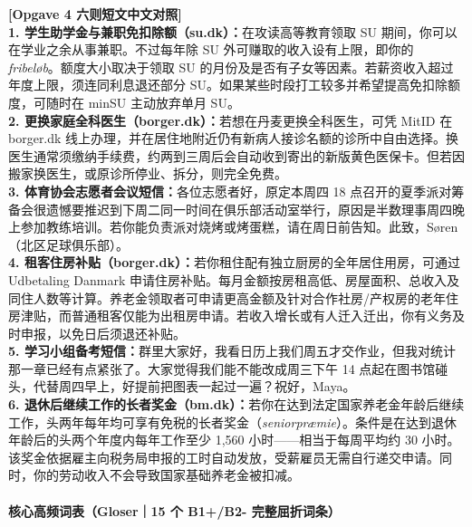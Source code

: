 \begin{transbox}
\small
\textbf{\color{NCDTeal}[Opgave 4 六则短文中文对照]}\\
\textbf{1. 学生助学金与兼职免扣除额（su.dk）：}在攻读高等教育领取 SU 期间，你可以在学业之余从事兼职。不过每年除 SU 外可赚取的收入设有上限，即你的 \textit{fribeløb}。额度大小取决于领取 SU 的月份及是否有子女等因素。若薪资收入超过年度上限，须连同利息退还部分 SU。如果某些时段打工较多并希望提高免扣除额度，可随时在 minSU 主动放弃单月 SU。\\
\textbf{2. 更换家庭全科医生（borger.dk）：}若想在丹麦更换全科医生，可凭 MitID 在 borger.dk 线上办理，并在居住地附近仍有新病人接诊名额的诊所中自由选择。换医生通常须缴纳手续费，约两到三周后会自动收到寄出的新版黄色医保卡。但若因搬家换医生，或原诊所停业、拆分，则完全免费。\\
\textbf{3. 体育协会志愿者会议短信：}各位志愿者好，原定本周四 18 点召开的夏季派对筹备会很遗憾要推迟到下周二同一时间在俱乐部活动室举行，原因是半数理事周四晚上参加教练培训。若你能负责派对烧烤或烤蛋糕，请在周日前告知。此致，Søren（北区足球俱乐部）。\\
\textbf{4. 租客住房补贴（borger.dk）：}若你租住配有独立厨房的全年居住用房，可通过 Udbetaling Danmark 申请住房补贴。每月金额按房租高低、房屋面积、总收入及同住人数等计算。养老金领取者可申请更高金额及针对合作社房/产权房的老年住房津贴，而普通租客仅能为出租房申请。若收入增长或有人迁入迁出，你有义务及时申报，以免日后须退还补贴。\\
\textbf{5. 学习小组备考短信：}群里大家好，我看日历上我们周五才交作业，但我对统计那一章已经有点紧张了。大家觉得我们能不能改成周三下午 14 点起在图书馆碰头，代替周四早上，好提前把图表一起过一遍？祝好，Maya。\\
\textbf{6. 退休后继续工作的长者奖金（bm.dk）：}若你在达到法定国家养老金年龄后继续工作，头两年每年均可享有免税的长者奖金（\textit{seniorpræmie}）。条件是在达到退休年龄后的头两个年度内每年工作至少 1,560 小时——相当于每周平均约 30 小时。该奖金依据雇主向税务局申报的工时自动发放，受薪雇员无需自行递交申请。同时，你的劳动收入不会导致国家基础养老金被扣减。
\end{transbox}

\paragraph*{核心高频词表（Gloser｜15 个 B1+/B2- 完整屈折词条）}

